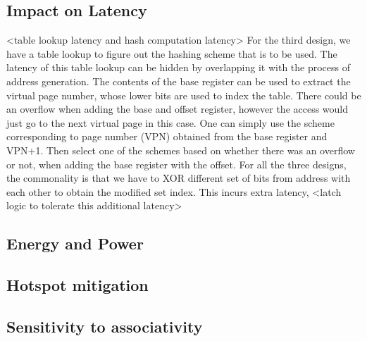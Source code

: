 \subsection {Impact on Latency} <table lookup latency and hash computation latency>
For the third design, we have a table lookup to figure out the hashing scheme that is to be used. The latency of this table lookup can be hidden by overlapping it with the process of address generation. The contents of the base register can be used to extract the virtual page number, whose lower bits are used to index the table. There could be an overflow when adding the base and offset register, however the access would just go to the next virtual page in this case. One can simply use the scheme corresponding to page number (VPN) obtained from the base register and VPN+1. Then select one of the schemes based on whether there was an overflow or not, when adding the base register with the offset.
For all the three designs, the commonality is that we have to XOR different set of bits from address with each other to obtain the modified set index. This incurs extra latency, <latch logic to tolerate this additional latency> 
\subsection {Energy and Power}
\subsection{Hotspot mitigation}
\subsection{Sensitivity to associativity}

